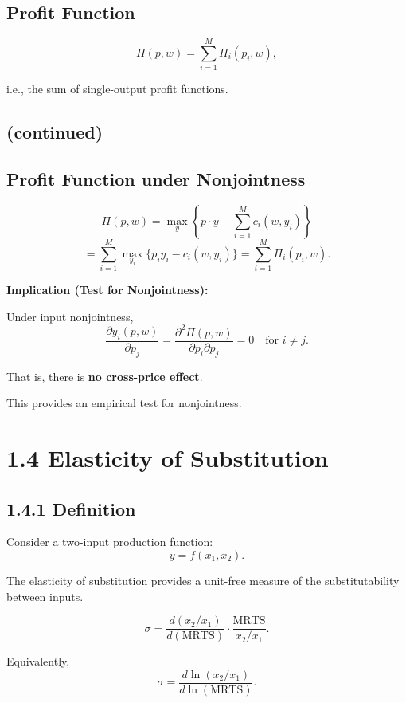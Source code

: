 \subsection*{Profit Function}

\[
\Pi(p,w)
=
\sum_{i=1}^M \Pi_i(p_i,w),
\]

i.e., the sum of single-output profit functions.


\subsection*{(continued)}

\subsection*{Profit Function under Nonjointness}

\[
\Pi(p,w)
=
\max_y \left\{ p\cdot y - \sum_{i=1}^M c_i(w,y_i) \right\}
\]
\[
=
\sum_{i=1}^M \max_{y_i} \{ p_i y_i - c_i(w,y_i) \}
=
\sum_{i=1}^M \Pi_i(p_i,w).
\]

\medskip

\textbf{Implication (Test for Nonjointness):}

Under input nonjointness,
\[
\frac{\partial y_i(p,w)}{\partial p_j}
=
\frac{\partial^2 \Pi(p,w)}{\partial p_i \partial p_j}
=
0
\quad \text{for } i \ne j.
\]

\medskip

That is, there is \textbf{no cross-price effect}.

This provides an empirical test for nonjointness.

\section{1.4 Elasticity of Substitution}

\subsection*{1.4.1 Definition}

Consider a two-input production function:
\[
y = f(x_1, x_2).
\]

The elasticity of substitution provides a unit-free measure of the
substitutability between inputs.

\[
\sigma
=
\frac{d(x_2/x_1)}{d(\text{MRTS})}
\cdot
\frac{\text{MRTS}}{x_2/x_1}.
\]

Equivalently,
\[
\sigma
=
\frac{d \ln(x_2/x_1)}{d \ln(\text{MRTS})}.
\]

